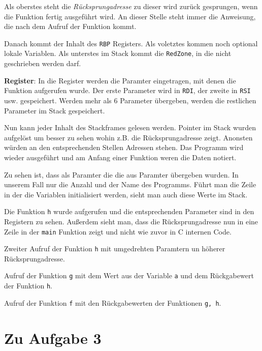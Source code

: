 \documentclass[12pt]{article}
\begin{document}
Als oberstes steht die \textit{Rücksprungadresse} zu dieser wird zurück gesprungen, wenn die Funktion fertig ausgeführt wird. An dieser Stelle steht immer die Anweisung, die nach dem Aufruf der Funktion kommt. 

Danach kommt der Inhalt des \texttt{RBP} Registers. %
Als voletztes kommen noch optional lokale Variablen.
Als unterstes im Stack kommt die \texttt{RedZone}, in die nicht geschrieben werden darf.

\textbf{Register}: \newline
In die Register werden die Paramter eingetragen, mit denen die Funktion aufgerufen wurde. Der erste Parameter wird in \texttt{RDI}, der zweite in \texttt{RSI} usw. gespeichert. Werden mehr als 6 Parameter übergeben, werden die restlichen Parameter im Stack gespeichert.

Nun kann jeder Inhalt des Stackframes gelesen werden. Pointer im Stack wurden aufgelöst um besser zu sehen wohin z.B. die Rücksprungadresse zeigt. Anonsten würden an den entsprechenden Stellen Adressen stehen. Das Programm wird wieder ausgeführt und am Anfang einer Funktion weren die Daten notiert.

Zu sehen ist, dass als Paramter die die aus Paramter übergeben wurden. In unserem Fall nur die Anzahl und der Name des Programms. Führt man die Zeile in der die Variablen initialisiert werden, sieht man auch diese Werte im Stack.

Die Funktion \texttt{h} wurde aufgerufen und die entsprechenden Parameter sind in den Registern zu sehen. Außerdem sieht man, dass die Rücksprungadresse nun in eine Zeile in der \texttt{main} Funktion zeigt und nicht wie zuvor in C internen Code.

Zweiter Aufruf der Funktion \texttt{h} mit umgedrehten Paramtern un höherer Rücksprungadresse. 

Aufruf der Funktion \texttt{g} mit dem Wert aus der Variable \texttt{a} und dem Rückgabewert der Funktion \texttt{h}.

Aufruf der Funktion \texttt{f} mit den Rückgabewerten der Funktionen \texttt{g, h}.








\newpage
\section{Zu Aufgabe 3}
\end{document}

